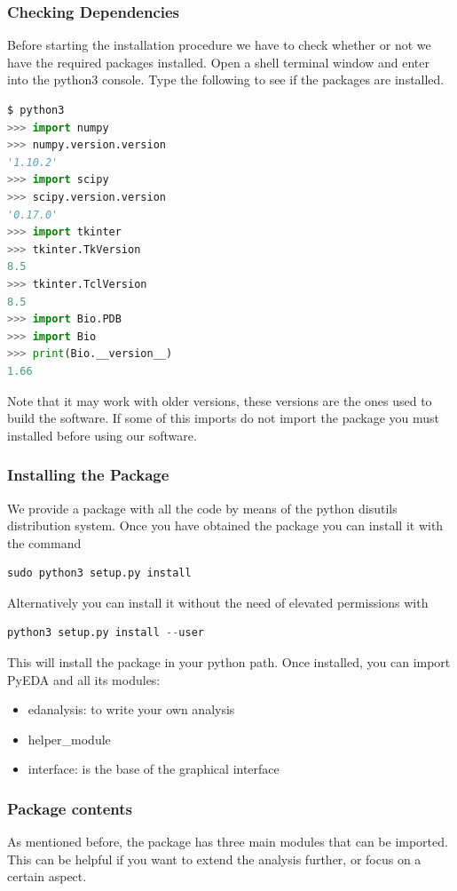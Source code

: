 \documentclass[12pt]{article}
\begin{document}
\subsubsection{Checking Dependencies}
Before starting the installation procedure we have to check whether or not we have the required packages installed. Open a shell terminal window and enter into the python3 console. Type the following to see if the packages are installed.
\begin{lstlisting}[language=Python]
$ python3
>>> import numpy
>>> numpy.version.version
'1.10.2'
>>> import scipy
>>> scipy.version.version
'0.17.0'
>>> import tkinter
>>> tkinter.TkVersion
8.5
>>> tkinter.TclVersion
8.5
>>> import Bio.PDB
>>> import Bio
>>> print(Bio.__version__)
1.66
\end{lstlisting}
Note that it may work with older versions, these versions are the ones used to build the software. If some of this imports do not import the package you must installed before using our software. 

\subsubsection{Installing the Package}
We provide a package with all the code by means of the python disutils distribution system. Once you have obtained the package you can install it with the command
\begin{lstlisting}[language=Python]
sudo python3 setup.py install
\end{lstlisting}
Alternatively you can install it without the need of elevated permissions with 
\begin{lstlisting}[language=Python]
python3 setup.py install --user
\end{lstlisting}

This will install the package in your python path. Once installed, you can import PyEDA and all its modules:
\begin{itemize}
\item edanalysis: to write your own analysis
\item helper\_module
\item interface: is the base of the graphical interface
\end{itemize} 

\subsubsection{Package contents}
As mentioned before, the package has three main modules that can be imported. This can be helpful if you want to extend the analysis further, or focus on a certain aspect.\\
\end{document}
